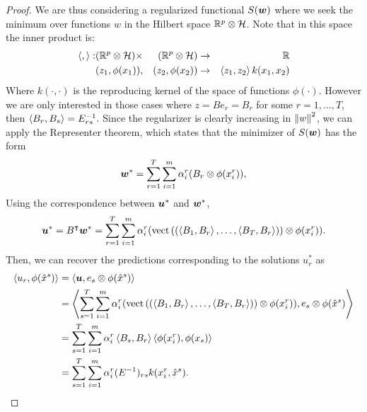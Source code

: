 \begin{proof}
We are thus considering a regularized functional $S(\bm{w})$ where we seek the minimum over functions $w$ in the Hilbert space $\mathbb{R}^p \otimes \mathcal{H}$. Note that in this space the inner product is:
\begin{equation}
    \nonumber
    \begin{aligned}
        \left\langle ,  \right\rangle: &(\mathbb{R}^p \otimes \mathcal{H}) \times &(\mathbb{R}^p \otimes \mathcal{H}) &\to &\mathbb{R} \\
    &(z_1, \phi(x_1)), &(z_2, \phi(x_2)) &\to &\left\langle z_1, z_2 \right\rangle k(x_1, x_2)
    \end{aligned}
\end{equation}
Where $k(\cdot, \cdot)$ is the reproducing kernel of the space of functions $\phi(\cdot)$.
However we are only interested in those cases where $z = B e_r = B_r$ for some $r=1, \ldots, T$, then $\left\langle B_r, B_s \right\rangle = E^{-1}_{rs}.$
Since the regularizer is clearly increasing in $\left\lVert w\right\rVert^2$, we can apply the Representer theorem, which states that the minimizer of $S(\bm{w})$ has the form
\begin{equation}
    \nonumber
    \bm{w}^* = \sum_{r=1}^T \sum_{i=1}^m \alpha_i^r (B_r \otimes \phi(x_i^r)) ,
\end{equation}
Using the correspondence between $\bm{u}^*$ and $\bm{w}^*$, 
\begin{equation}
    \nonumber
    \bm{u}^* = B^\intercal \bm{w}^* =  \sum_{r=1}^T \sum_{i=1}^m \alpha_i^r (\bm{\text{vect}}\left((\left\langle B_1, B_r \right\rangle, \ldots, \left\langle B_T, B_r \right\rangle)\right) \otimes \phi(x_i^r)).
\end{equation}
Then, we can recover the predictions corresponding to the solutions $u_r^*$ as
\begin{equation}
    \nonumber
    \begin{aligned}
        \left\langle u_r, \phi(\hat{x}^s) \right\rangle &= \left\langle \bm{u}, e_s \otimes \phi(\hat{x}^s) \right\rangle \\
        &= \left\langle \sum_{s=1}^T \sum_{i=1}^m \alpha_i^r (\bm{\text{vect}}\left((\left\langle B_1, B_r \right\rangle, \ldots, \left\langle B_T, B_r \right\rangle)\right) \otimes \phi(x_i^r)), e_s \otimes \phi(\hat{x}^s) \right\rangle \\
        &= \sum_{s=1}^T \sum_{i=1}^m \alpha_i^r  \left\langle B_s, B_r \right\rangle \left\langle \phi(x_i^r), \phi(x_s) \right\rangle \\
        &= \sum_{s=1}^T \sum_{i=1}^m \alpha_i^r  (E^{-1})_{rs} k(x_i^r, \hat{x}^s).
    \end{aligned}
\end{equation}
\end{proof}
